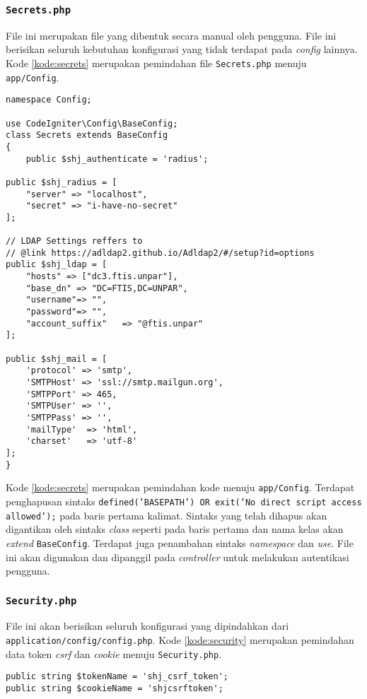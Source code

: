 \subsubsection{\texttt{Secrets.php}}
File ini merupakan file yang dibentuk secara manual oleh pengguna. File ini berisikan seluruh kebutuhan konfigurasi yang tidak terdapat pada \textit{config} lainnya. Kode \ref{kode:secrets} merupakan pemindahan file \texttt{Secrets.php} menuju \texttt{app/Config}.
\begin{lstlisting}[caption=Penambahan file \textit{secrets}, label=kode:secrets]
namespace Config;

use CodeIgniter\Config\BaseConfig;
class Secrets extends BaseConfig
{ 
	public $shj_authenticate = 'radius';

public $shj_radius = [
    "server" => "localhost",
    "secret" => "i-have-no-secret"
];

// LDAP Settings reffers to
// @link https://adldap2.github.io/Adldap2/#/setup?id=options
public $shj_ldap = [
    "hosts" => ["dc3.ftis.unpar"],
    "base_dn" => "DC=FTIS,DC=UNPAR",
    "username"=> "",
    "password"=> "",
    "account_suffix"   => "@ftis.unpar"
];

public $shj_mail = [
    'protocol' => 'smtp',
    'SMTPHost' => 'ssl://smtp.mailgun.org',
    'SMTPPort' => 465,
    'SMTPUser' => '',
    'SMTPPass' => '',
    'mailType'  => 'html',
    'charset'   => 'utf-8'
];
}
\end{lstlisting}

Kode \ref{kode:secrets} merupakan pemindahan kode menuju \texttt{app/Config}. Terdapat penghapusan sintaks \texttt{defined('BASEPATH') OR exit('No direct script access allowed');} pada baris pertama kalimat. Sintaks yang telah dihapus akan digantikan oleh sintaks \textit{class} seperti pada baris pertama dan nama kelas akan \textit{extend} \texttt{BaseConfig}. Terdapat juga penambahan sintaks \textit{namespace} dan \textit{use}. File ini akan digunakan dan dipanggil pada \textit{controller} untuk melakukan autentikasi pengguna.

\subsubsection{\texttt{Security.php}}
File ini akan berisikan seluruh konfigurasi yang dipindahkan dari \texttt{application/config/config.php}. Kode \ref{kode:security} merupakan pemindahan data token \textit{csrf} dan \textit{cookie} menuju \texttt{Security.php}.
\begin{lstlisting}[caption=Pemindahan file \textit{config} menuju \textit{Security}, label=kode:security]
public string $tokenName = 'shj_csrf_token';
public string $cookieName = 'shjcsrftoken';
\end{lstlisting}

